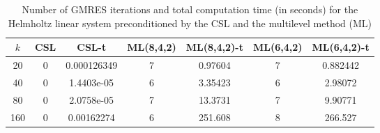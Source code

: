 \begin{table}[t]
\centering
\begin{tabular}{ccccccc}
\hline
$k$ & CSL & CSL-t & ML(8,4,2) & ML(8,4,2)-t& ML(6,4,2) & ML(6,4,2)-t \\ \hline
20 & 0 & 0.000126349 & 7 & 0.97604 & 7 & 0.882442 \\
40 & 0 & 1.4403e-05 & 6 & 3.35423 & 6 & 2.98072 \\
80 & 0 & 2.0758e-05 & 7 & 13.3731 & 7 & 9.90771 \\
160 & 0 & 0.00162274 & 6 & 251.608 & 8 & 266.527 \\
\hline
\end{tabular}
\caption{Number of GMRES iterations and total computation time (in seconds) for the Helmholtz linear system preconditioned by the  CSL and the multilevel method (ML)}
\label{table:mlgmres_csl_vs_adef_coarse_eps_10}
\end{table}
